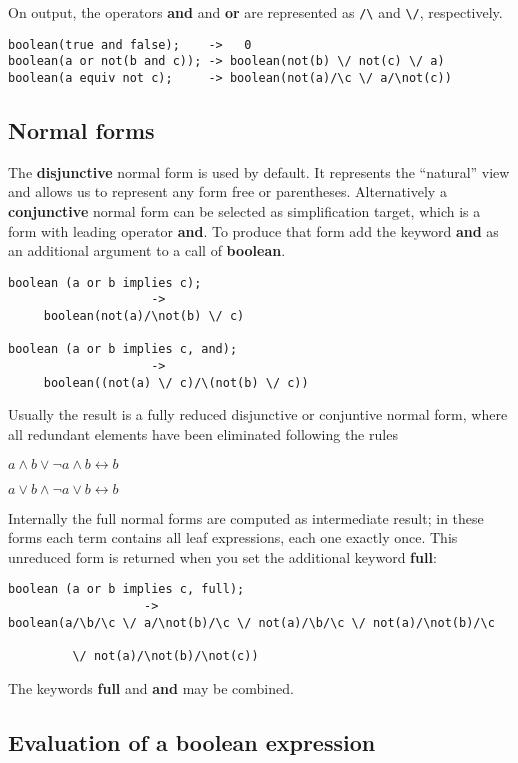 On output, the
operators \textbf{and} and \textbf{or} are represented as
\texttt{/\textbackslash} and \texttt{\textbackslash /}, respectively.
\begin{verbatim}
boolean(true and false);    ->   0
boolean(a or not(b and c)); -> boolean(not(b) \/ not(c) \/ a)
boolean(a equiv not c);     -> boolean(not(a)/\c \/ a/\not(c))
\end{verbatim}

\subsection{Normal forms}

The \textbf{disjunctive} normal form is used by default. It
represents the ``natural'' view and allows us to represent
any form free or parentheses.
Alternatively a \textbf{conjunctive} normal form can be
selected as simplification target, which is a form with
leading operator \textbf{and}. To produce that form add the keyword  \textbf{and}
as an additional argument to a call of \textbf{boolean}.
\begin{verbatim}
boolean (a or b implies c); 
                    -> 
     boolean(not(a)/\not(b) \/ c)

boolean (a or b implies c, and); 
                    ->
     boolean((not(a) \/ c)/\(not(b) \/ c))
\end{verbatim}

Usually the result is a fully reduced disjunctive or conjuntive normal
form, where all redundant elements have been eliminated following the
rules

$ a \wedge b \vee \neg a \wedge b \longleftrightarrow b$

$ a \vee b \wedge \neg a \vee b \longleftrightarrow b$
 

Internally the full normal forms are computed
as intermediate result; in these forms each term contains
all leaf expressions, each one exactly once. This unreduced form is returned 
when you set the additional keyword \textbf{full}:
\begin{verbatim}
boolean (a or b implies c, full);
                   ->
boolean(a/\b/\c \/ a/\not(b)/\c \/ not(a)/\b/\c \/ not(a)/\not(b)/\c

         \/ not(a)/\not(b)/\not(c))
\end{verbatim}

The keywords \textbf{full} and \textbf{and} may be combined.

\subsection{Evaluation of a boolean expression}

